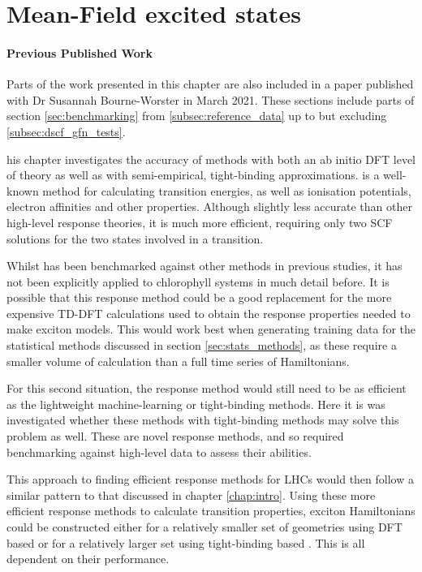 %
%
\chapter{Mean-Field excited states}
\label{chap:dscf}

\subsubsection*{Previous Published Work}
Parts of the work presented in this chapter are also included in a paper published 
with Dr Susannah Bourne-Worster in March 2021\cite{Worster2021}. These sections
include parts of section \ref{sec:benchmarking} from \ref{subsec:reference_data}
up to but excluding \ref{subsec:dscf_gfn_tests}.

his chapter investigates the accuracy of \dscf methods with  both an 
ab initio DFT level of theory as well as with semi-empirical, tight-binding approximations.
\dscf is a well-known method for calculating transition energies, as well as
ionisation potentials, electron affinities and other properties. Although slightly
less accurate than other high-level response theories, it is much more efficient,
requiring only two SCF solutions for the two states involved in a transition. 

Whilst \dscf has been benchmarked against other methods in previous studies, it
has not been explicitly applied to chlorophyll systems in much detail before. It
is possible that this response method could be a good replacement for the more expensive
TD-DFT calculations used to obtain the response properties needed to make exciton
models. This would work best when generating training data for the statistical methods
discussed in section \ref{sec:stats_methods}, as these require a smaller volume
of calculation than a full time series of Hamiltonians.

For this second situation, the response method would still need to be as efficient
as the lightweight machine-learning or tight-binding methods. Here it is was investigated
whether these \dscf methods with tight-binding methods may solve this problem as
well. These are novel response methods, and so required benchmarking against high-level 
data to assess their abilities.

This approach to finding efficient response methods for LHCs would then follow a
similar pattern to that discussed in chapter \ref{chap:intro}. Using these more
efficient response methods to calculate transition properties, exciton Hamiltonians
could be constructed either for a relatively smaller set of geometries using DFT
based \dscf or for a relatively larger set using tight-binding based \dscf. This
is all dependent on their performance.

